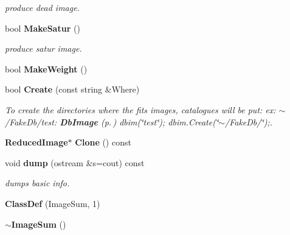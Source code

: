 \begin{CompactItemize}
\begin{CompactList}\small\item\em produce dead image.\item\end{CompactList}\item 
{}
bool {\bf Make\-Satur} ()\label{class_imagesum_a7}

\begin{CompactList}\small\item\em produce satur image.\item\end{CompactList}\item 
{}
bool {\bf Make\-Weight} ()\label{class_imagesum_a8}

\item 
{}
bool {\bf Create} (const string \&Where)\label{class_imagesum_a9}

\begin{CompactList}\small\item\em To create the directories where the fits images, catalogues will be put: ex: $\sim$/Fake\-Db/test: {\bf Db\-Image} {\rm (p.\,\pageref{class_dbimage})} dbim(\char`\"{}test\char`\"{}); dbim.Create(\char`\"{}$\sim$/Fake\-Db/\char`\"{});.\item\end{CompactList}\item 
{}
{\bf Reduced\-Image}$\ast$ {\bf Clone} () const\label{class_imagesum_a10}

\item 
{}
void {\bf dump} (ostream \&s=cout) const\label{class_imagesum_a11}

\begin{CompactList}\small\item\em dumps basic info.\item\end{CompactList}\item 
{}
{\bf Class\-Def} (Image\-Sum, 1)\label{class_imagesum_a12}

\item 
{}
{\bf $\sim$Image\-Sum} ()\label{class_imagesum_a13}

\end{CompactItemize}


